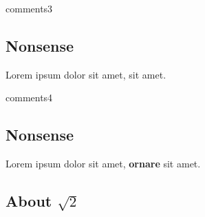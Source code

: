 	\begin{saveblock}{comments3}
		\begin{highlightblock}[linewidth=0.6\textwidth,gobble=12]
			\section{Nonsense}

			Lorem ipsum dolor sit amet,
			 sit amet.
            
		\end{highlightblock}
	\end{saveblock}

	\begin{saveblock}{comments4}
		\begin{highlightblock}[linewidth=0.6\textwidth,gobble=12]
			\section{Nonsense}

			Lorem ipsum dolor sit amet,
			\textbf{ornare} sit amet.
            
			\subsection{About $\sqrt{2}$}
		\end{highlightblock}
	\end{saveblock}

